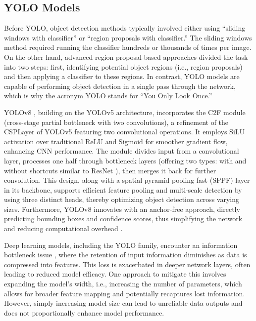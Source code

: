 \subsection{YOLO Models}
Before YOLO, object detection methods typically involved either using “sliding windows with classifier” or “region proposals with classifier.” The sliding windows method required running the classifier hundreds or thousands of times per image. On the other hand, advanced region proposal-based approaches divided the task into two steps: first, identifying potential object regions (i.e., region proposals) and then applying a classifier to these regions. In contrast, YOLO models are capable of performing object detection in a single pass through the network, which is why the acronym YOLO stands for “You Only Look Once.”

YOLOv8 \cite{ultralyticsYOLOv8}, building on the YOLOv5 \cite{Jocher2020YOLOv5} architecture, incorporates the C2F module (cross-stage partial bottleneck with two convolutions), a refinement of the CSPLayer of YOLOv5 featuring two convolutional operations. It employs SiLU activation over traditional ReLU and Sigmoid \cite{elfwing2018sigmoid} for smoother gradient flow, enhancing CNN performance. The module divides input from a convolutional layer, processes one half through bottleneck layers (offering two types: with and without shortcuts similar to ResNet \cite{targ2016resnet}), then merges it back for further convolution. This design, along with a spatial pyramid pooling fast (SPPF) layer in its backbone, supports efficient feature pooling and multi-scale detection by using three distinct heads, thereby optimizing object detection across varying sizes. Furthermore, YOLOv8 innovates with an anchor-free approach, directly predicting bounding boxes and confidence scores, thus simplifying the network and reducing computational overhead \cite{law2018cornernet,duan2019centernet,tian2019fcos}.

Deep learning models, including the YOLO family, encounter an information bottleneck issue \cite{tishby2015deep,tishby2000information}, where the retention of input information diminishes as data is compressed into features. This loss is exacerbated in deeper network layers, often leading to reduced model efficacy. One approach to mitigate this involves expanding the model’s width, i.e., increasing the number of parameters, which allows for broader feature mapping and potentially recaptures lost information. However, simply increasing model size can lead to unreliable data outputs and does not proportionally enhance model performance.

